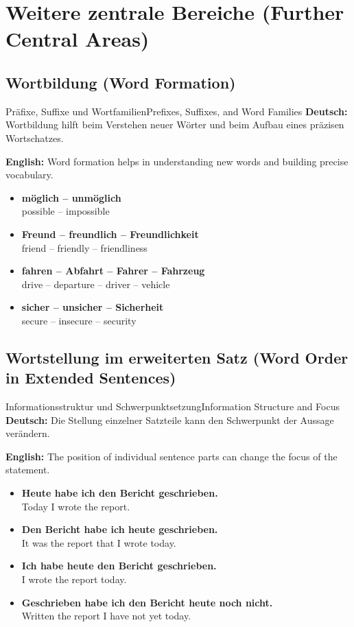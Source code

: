 \documentclass[a4paper,11pt]{article}
\newcommand{\GermanText}[1]{\textbf{Deutsch: }#1\par}
\newcommand{\EnglishText}[1]{{\color{SoftGray}\textbf{English: }#1\par}}
\newcommand{\ExampleItem}[2]{\item \textbf{#1}\\{\color{SoftGray}#2}}
\begin{document}
\section{Weitere zentrale Bereiche {\small (Further Central Areas)}}

\subsection{Wortbildung {\small (Word Formation)}}

\begin{grammarentry}{Präfixe, Suffixe und Wortfamilien}{Prefixes, Suffixes, and Word Families}
    \GermanText{Wortbildung hilft beim Verstehen neuer Wörter und beim Aufbau eines präzisen Wortschatzes.}
    \EnglishText{Word formation helps in understanding new words and building precise vocabulary.}
    \begin{exbox}
        \begin{itemize}
            \ExampleItem{möglich -- unmöglich}{possible -- impossible}
            \ExampleItem{Freund -- freundlich -- Freundlichkeit}{friend -- friendly -- friendliness}
            \ExampleItem{fahren -- Abfahrt -- Fahrer -- Fahrzeug}{drive -- departure -- driver -- vehicle}
            \ExampleItem{sicher -- unsicher -- Sicherheit}{secure -- insecure -- security}
        \end{itemize}
    \end{exbox}
\end{grammarentry}

\subsection{Wortstellung im erweiterten Satz {\small (Word Order in Extended Sentences)}}

\begin{grammarentry}{Informationsstruktur und Schwerpunktsetzung}{Information Structure and Focus}
    \GermanText{Die Stellung einzelner Satzteile kann den Schwerpunkt der Aussage verändern.}
    \EnglishText{The position of individual sentence parts can change the focus of the statement.}
    \begin{exbox}
        \begin{itemize}
            \ExampleItem{Heute habe ich den Bericht geschrieben.}{Today I wrote the report.}
            \ExampleItem{Den Bericht habe ich heute geschrieben.}{It was the report that I wrote today.}
            \ExampleItem{Ich habe heute den Bericht geschrieben.}{I wrote the report today.}
            \ExampleItem{Geschrieben habe ich den Bericht heute noch nicht.}{Written the report I have not yet today.}
        \end{itemize}
    \end{exbox}
\end{grammarentry}
\end{document}
